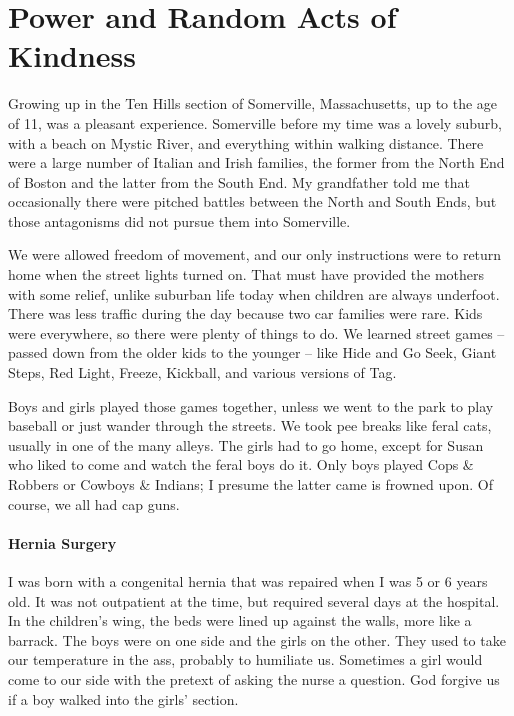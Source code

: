 \section{Power and Random Acts of Kindness}

Growing up in the Ten Hills section of Somerville, Massachusetts, up to the age of 11, was a pleasant experience. Somerville before my time was a lovely suburb, with a beach on Mystic River, and everything within walking distance. There were a large number of Italian and Irish families, the former from the North End of Boston and the latter from the South End. My grandfather told me that occasionally there were pitched battles between the North and South Ends, but those antagonisms did not pursue them into Somerville.

We were allowed freedom of movement, and our only instructions were to return home when the street lights turned on. That must have provided the mothers with some relief, unlike suburban life today when children are always underfoot. There was less traffic during the day because two car families were rare. Kids were everywhere, so there were plenty of things to do. We learned street games -- passed down from the older kids to the younger -- like Hide and Go Seek, Giant Steps, Red Light, Freeze, Kickball, and various versions of Tag.

Boys and girls played those games together, unless we went to the park to play baseball or just wander through the streets. We took pee breaks like feral cats, usually in one of the many alleys. The girls had to go home, except for Susan who liked to come and watch the feral boys do it. Only boys played Cops \& Robbers or Cowboys \& Indians; I presume the latter came is frowned upon. Of course, we all had cap guns.

\paragraph{Hernia Surgery}


I was born with a congenital hernia that was repaired when I was 5 or 6 years old. It was not outpatient at the time, but required several days at the hospital. In the children's wing, the beds were lined up against the walls, more like a barrack. The boys were on one side and the girls on the other. They used to take our temperature in the ass, probably to humiliate us. Sometimes a girl would come to our side with the pretext of asking the nurse a question. God forgive us if a boy walked into the girls' section.

